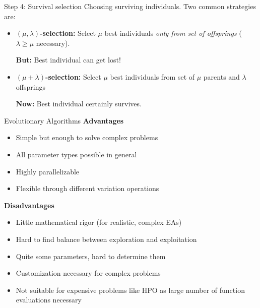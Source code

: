 \documentclass[11pt,compress,t,notes=noshow, xcolor=table]{beamer}
\begin{document}
\begin{vbframe}{Step 4: Survival selection}
Choosing surviving individuals.
Two common strategies are:

\vspace{1em}

\begin{itemize}
    \setlength{\itemsep}{1em}
    \item \textbf{$(\mu, \lambda)$-selection:}
        Select $\mu$ best individuals \textit{only from set of offsprings} ($\lambda \ge \mu$ necessary).
        
        \textbf{But:} Best individual can get lost!
    \item \textbf{$(\mu + \lambda)$-selection:}
        Select $\mu$ best individuals from set of $\mu$ parents and $\lambda$ offsprings
        
        \textbf{Now:} Best individual certainly survives.
\end{itemize}

\end{vbframe}

\begin{vbframe}{Evolutionary Algorithms}
\textbf{Advantages}
\begin{itemize}
    \item Simple but enough to solve complex problems %
    \item All parameter types possible in general
    \item Highly parallelizable
    \item Flexible through different variation operations
\end{itemize}

\medskip

\textbf{Disadvantages}
\begin{itemize}
    \item Little mathematical rigor (for realistic, complex EAs)
    \item Hard to find balance between exploration and exploitation
    \item Quite some parameters, hard to determine them
    \item Customization necessary for complex problems
    \item Not suitable for expensive problems like HPO as large number of function evaluations necessary
\end{itemize}
\end{vbframe}
\end{document}
